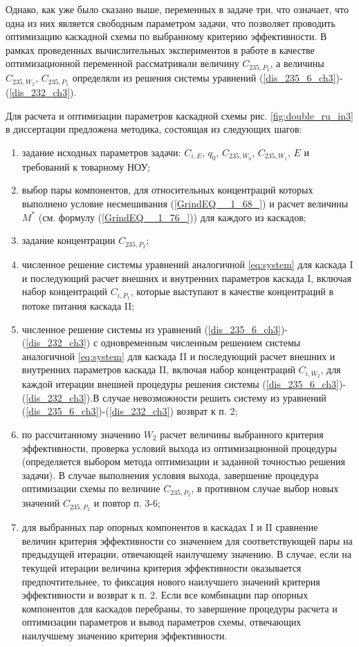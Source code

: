Однако, как уже было сказано выше, переменных в задаче три, что означает, что одна из них является свободным параметром задачи, что позволяет проводить оптимизацию каскадной схемы по выбранному критерию эффективности. В рамках проведенных вычислительных экспериментов в работе в качестве оптимизационной переменной рассматривали величину $C_{235,{P_2}}$, а величины $C_{235,{W_2}}$, $C_{235,{P_1}}$ определяли из решения системы уравнений (\ref{dis_235_6_ch3})-(\ref{dis_232_ch3}).  

Для расчета и оптимизации параметров каскадной схемы рис. \ref{fig:double_ru_in3} в диссертации предложена методика, состоящая из следующих шагов:

\begin{enumerate}
    \item задание исходных параметров задачи: $C_{i,E}$, $q_0$, $C_{235,{W_0}}$, $C_{235,{W_1}}$, $E$ и требований к товарному НОУ;
    \item выбор пары компонентов, для относительных концентраций которых выполнено условие несмешивания (\ref{GrindEQ__1_68_}) и расчет величины $M^{*}$ (см. формулу (\ref{GrindEQ__1_76_})) для каждого из каскадов;
    \item задание концентрации $C_{235,{P_2}}$;
    \item численное решение системы уравнений аналогичной \ref{eq:system} для каскада I и последующий расчет внешних и внутренних параметров каскада I, включая набор концентраций $C_{i,{P_1}}$, которые выступают в качестве концентраций в потоке питания каскада II;
    \item численное решение системы из уравнений (\ref{dis_235_6_ch3})-(\ref{dis_232_ch3}) с одновременным численным решением системы аналогичной \ref{eq:system} для каскада II и последующий расчет внешних и внутренних параметров каскада II, включая набор концентраций $C_{i,{W_2}}$, для каждой итерации внешней процедуры решения системы (\ref{dis_235_6_ch3})-(\ref{dis_232_ch3}).В случае невозможности решить систему из уравнений (\ref{dis_235_6_ch3})-(\ref{dis_232_ch3}) возврат к п. 2;
    \item по рассчитанному значению $W_2$ расчет величины выбранного критерия эффективности, проверка условий выхода из оптимизационной процедуры (определяется выбором метода оптимизации и заданной точностью решения задачи). В случае выполнения условия выхода, завершение процедура оптимизации схемы по величине  $C_{235,{P_2}}$, в противном случае выбор новых значений $C_{235,{P_2}}$ и повтор п. 3-6;
    \item для выбранных пар опорных компонентов в каскадах I и II сравнение величин критерия эффективности со значением для соответствующей пары на предыдущей итерации, отвечающей наилучшему значению. В случае, если на текущей итерации величина критерия эффективности оказывается предпочтительнее, то фиксация нового наилучшего значений критерия эффективности и возврат к п. 2. Если все комбинации пар опорных компонентов для каскадов перебраны, то завершение процедуры расчета и оптимизации параметров и вывод параметров схемы, отвечающих наилучшему значению критерия эффективности. 
\end{enumerate}

